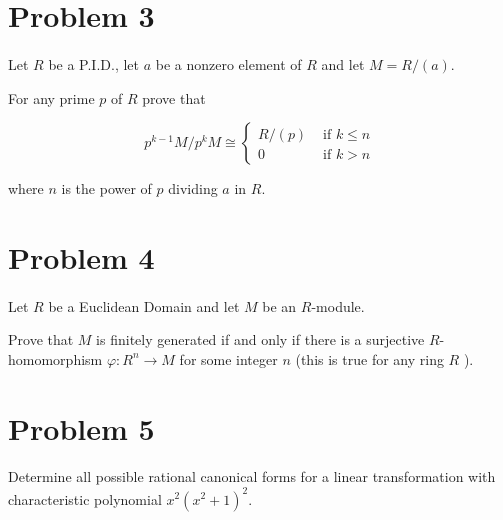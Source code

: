 \documentclass{article}
\begin{document}
\section*{Problem 3}\paragraph{}Let $R$ be a P.I.D., let $a$ be a nonzero element of $R$ and let $M=R /(a)$.

For any prime $p$ of $R$ prove that

$$
p^{k-1} M / p^k M \cong \begin{cases}R /(p) & \text { if } k \leq n \\ 0 & \text { if } k>n\end{cases}
$$

where $n$ is the power of $p$ dividing $a$ in $R$.

\section*{Problem 4}\paragraph{}Let $R$ be a Euclidean Domain and let $M$ be an $R$-module.

Prove that $M$ is finitely generated if and only if there is a surjective $R$-homomorphism $\varphi: R^n \rightarrow M$ for some integer $n$ (this is true for any ring $R$ ).

\section*{Problem 5}\paragraph{}Determine all possible rational canonical forms for a linear transformation with characteristic polynomial $x^2\left(x^2+1\right)^2$.
\end{document}

